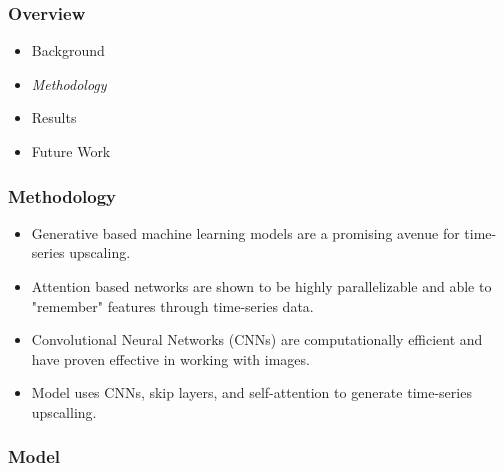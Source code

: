\begin{frame}
\frametitle{Overview}
    \begin{itemize}
        \item Background
        \item \emph{\color{UOYellow}Methodology}
        \item Results
        \item Future Work
    \end{itemize}
\end{frame}

\begin{frame}
\frametitle{Methodology}
    \begin{itemize}
        \item Generative based machine learning models are a promising avenue
            for time-series upscaling.
        \item Attention based networks are shown to be highly parallelizable and
            able to "remember" features through time-series data. 
        \item Convolutional Neural Networks (CNNs) are computationally efficient and
            have proven effective in working with images.
        \item Model uses CNNs, skip layers, and self-attention to generate
            time-series upscalling.
    \end{itemize}
\end{frame}

\begin{frame}
    \frametitle{Model}
    \center
\end{frame}

